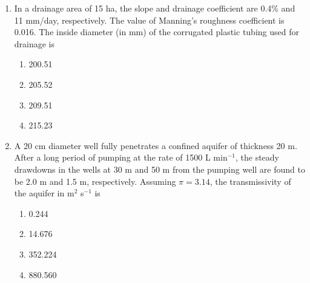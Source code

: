 \documentclass[12pt]{article}
\begin{document}
\begin{enumerate}[label =Q.\arabic*,start=26]
		\item In a drainage area of 15 ha, the slope and drainage coefficient are 0.4\% and 11 mm/day, respectively. The value of Manning's roughness coefficient is 0.016. The inside diameter (in mm) of the corrugated plastic tubing used for drainage is
			\begin{multicols}{4}
				\begin{enumerate}[label=(\Alph*)]
					\item 200.51
					\item 205.52
					\item 209.51
					\item 215.23
				\end{enumerate}
			\end{multicols}

		\item A 20 cm diameter well fully penetrates a confined aquifer of thickness 20 m. After a long period of pumping at the rate of 1500 L min$^{-1}$, the steady drawdowns in the wells at 30 m and 50 m from the pumping well are found to be 2.0 m and 1.5 m, respectively. Assuming $\pi = 3.14$, the transmissivity of the aquifer in m$^2$ s$^{-1}$ is
			\begin{multicols}{4}
				\begin{enumerate}[label=(\Alph*)]
					\item 0.244
					\item 14.676
					\item 352.224
					\item 880.560
				\end{enumerate}
			\end{multicols}


\end{enumerate}
\end{document}
